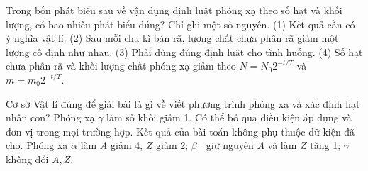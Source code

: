 \begin{ex}
Trong bốn phát biểu sau về vận dụng định luật phóng xạ theo số hạt và khối lượng, có bao nhiêu phát biểu đúng? Chỉ ghi một số nguyên. (1) Kết quả cần có ý nghĩa vật lí. (2) Sau mỗi chu kì bán rã, lượng chất chưa phân rã giảm một lượng cố định như nhau. (3) Phải dùng đúng định luật cho tình huống. (4) Số hạt chưa phân rã và khối lượng chất phóng xạ giảm theo $N=N_0 2^{-t/T}$ và $m=m_0 2^{-t/T}$.
\end{ex}

\begin{ex}
Cơ sở Vật lí đúng để giải bài là gì về viết phương trình phóng xạ và xác định hạt nhân con?
\choice
{Phóng xạ $\gamma$ làm số khối giảm 1.}
{Có thể bỏ qua điều kiện áp dụng và đơn vị trong mọi trường hợp.}
{Kết quả của bài toán không phụ thuộc dữ kiện đã cho.}
{\True Phóng xạ $\alpha$ làm $A$ giảm 4, $Z$ giảm 2; $\beta^-$ giữ nguyên $A$ và làm $Z$ tăng 1; $\gamma$ không đổi $A,Z$.}
\end{ex}

